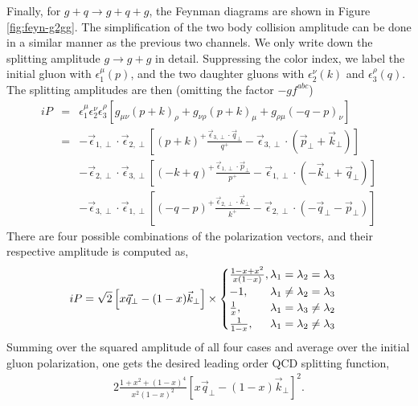 Finally, for $g+q\rightarrow g+q+g$, the Feynman diagrams are shown in Figure \ref{fig:feyn-g2gg}. 
The simplification of the two body collision amplitude can be done in a similar manner as the previous two channels. 
We only write down the splitting amplitude $g\rightarrow g+ g$ in detail.
Suppressing the color index, we label the initial gluon with $\epsilon_1^\mu(p)$, and the two daughter gluons with $\epsilon_2^\nu(k)$ and $\epsilon_3^\rho(q)$.
The splitting amplitudes are then (omitting the factor $-gf^{abc}$)
\begin{eqnarray}
iP &=& \epsilon^\mu_1\epsilon^\nu_2\epsilon^\rho_3
\left[
g_{\mu\nu} (p+k)_{\rho} +  g_{\nu\rho} (p+k)_{\mu} + g_{\rho\mu} (-q-p)_{\nu}
\right]\\
&=& -\vec{\epsilon}_{1,\perp}\cdot \vec{\epsilon}_{2,\perp} \left[(p+k)^+\frac{\vec{\epsilon}_{3,\perp}\cdot \vec{q}_\perp}{q^+} - \vec{\epsilon}_{3,\perp}\cdot (\vec{p}_\perp+\vec{k}_\perp)\right] \\\nonumber
&&-\vec{\epsilon}_{2,\perp}\cdot \vec{\epsilon}_{3,\perp} \left[(-k+q)^+\frac{\vec{\epsilon}_{1,\perp}\cdot \vec{p}_\perp}{p^+} - \vec{\epsilon}_{1,\perp}\cdot (-\vec{k}_\perp+\vec{q}_\perp)\right]
\\\nonumber
&&-\vec{\epsilon}_{3,\perp}\cdot \vec{\epsilon}_{1,\perp} \left[(-q-p)^+\frac{\vec{\epsilon}_{2,\perp}\cdot \vec{k}_\perp}{k^+} - \vec{\epsilon}_{2,\perp}\cdot (-\vec{q}_\perp-\vec{p}_\perp)\right]
\end{eqnarray}
There are four possible combinations of the polarization vectors, and their respective amplitude is computed as,
\begin{eqnarray}
iP = \sqrt{2}\left[x\vec{q}_\perp - (1-x)\vec{k}_\perp\right]\times 
\begin{cases}
\frac{1-x+x^2}{x(1-x)}, \hfill \lambda_1=\lambda_2=\lambda_3\\
-1, \hfill \lambda_1\neq\lambda_2=\lambda_3 \\
\frac{1}{x}, \hfill \lambda_1=\lambda_3\neq\lambda_2\\
\frac{1}{1-x}, \hfill \lambda_1=\lambda_2\neq\lambda_3
\end{cases}
\end{eqnarray}
Summing over the squared amplitude of all four cases and average over the initial gluon polarization, one gets the desired leading order QCD splitting function,
\begin{eqnarray}
2\frac{1+x^2+(1-x)^4}{x^2(1-x)^2} \left[x\vec{q}_\perp - (1-x)\vec{k}_\perp\right]^2.
\end{eqnarray}

